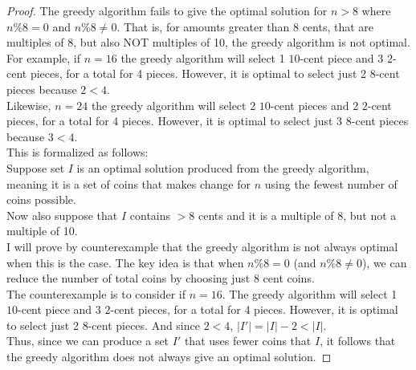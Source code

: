 \documentclass[11pt]{article}
\theoremstyle{definition}
\theoremstyle{definition}
\theoremstyle{definition}
\begin{document}


\begin{proof}
The greedy algorithm fails to give the optimal solution for $n>8$ where $n\%8 =0$ and $n\%8 \neq 0$. That is, for amounts greater than 8 cents, that are multiples of 8, but also NOT multiples of 10, the greedy algorithm is not optimal. \\
For example, if $n=16$ the greedy algorithm will select 1 $10$-cent piece and 3 $2$-cent pieces, for a total for 4 pieces. However, it is optimal to select just 2 $8$-cent pieces because $2<4$. \\
Likewise, $n=24$ the greedy algorithm will select 2 $10$-cent pieces and 2 $2$-cent pieces, for a total for 4 pieces. However, it is optimal to select just 3 $8$-cent pieces because $3<4$. \\

This is formalized as follows: \\
Suppose set $I$ is an optimal solution produced from the greedy algorithm, meaning it is a set of coins that makes change for $n$ using the fewest number of coins possible. \\
Now also suppose that $I$ contains $> 8$ cents and it is a multiple of 8, but not a multiple of 10. \\
I will prove by counterexample that the greedy algorithm is not always optimal when this is the case. The key idea is that when $n\%8=0$ (and  $n\%8 \neq 0$), we can reduce the number of total coins by choosing just 8 cent coins.\\
The counterexample is to consider if $n=16$. The greedy algorithm will select 1 $10$-cent piece and 3 $2$-cent pieces, for a total for 4 pieces. However, it is optimal to select just 2 $8$-cent pieces. And since $2<4$, $|I'| = |I| - 2 < |I|$. \\
Thus, since we can produce a set $I'$ that uses fewer coins that $I$, it follows that the greedy algorithm does not always give an optimal solution.

\end{proof}




\end{document}
